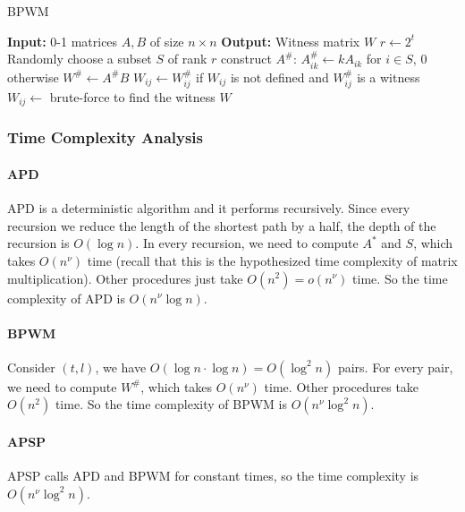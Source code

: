 \documentclass[12pt]{article}
\begin{document}
\begin{algorithm}
    \caption{BPWM}
    \label{alg:bp}
    \begin{algorithmic}
        \STATE \textbf{Input:} 0-1 matrices $A,B$ of size $n\times n$
        \STATE \textbf{Output:} Witness matrix $W$
            \STATE $r\leftarrow 2^t$
                \STATE Randomly choose a subset $S$ of rank $r$
                \STATE construct $A^{\#}$: $A^{\#}_{ik}\leftarrow kA_{ik}$ for $i\in S$, $0$ otherwise
                \STATE $W^{\#}\leftarrow A^{\#}B$
                    \STATE $W_{ij}\leftarrow W^{\#}_{ij}$ if $W_{ij}$ is not defined and $W^{\#}_{ij}$ is a witness
                \ENDFOR
            \ENDFOR
        \ENDFOR
                \STATE $W_{ij}\leftarrow$ brute-force to find the witness
            \ENDIF
        \ENDFOR
    \RETURN $W$
    \end{algorithmic}
\end{algorithm}

\subsubsection{Time Complexity Analysis}

\paragraph{APD} APD is a deterministic algorithm and it performs recursively. Since every recursion we reduce the length of the shortest path by a half, the depth of the recursion is $O(\log n)$. In every recursion, we need to compute $A^*$ and $S$, which takes $O(n^{\nu})$ time (recall that this is the hypothesized time complexity of matrix multiplication). Other procedures just take $O(n^2)=o(n^{\nu})$ time. So the time complexity of APD is $O(n^{\nu}\log n)$.

\paragraph{BPWM} Consider $(t,l)$, we have $O(\log n\cdot \log n)=O(\log^2 n)$ pairs. For every pair, we need to compute $W^{\#}$, which takes $O(n^{\nu})$ time. Other procedures take $O(n^2)$ time. So the time complexity of BPWM is $O(n^{\nu}\log^2 n)$.

\paragraph{APSP} APSP calls APD and BPWM for constant times, so the time complexity is $O(n^{\nu}\log^2 n)$.
\end{document}
